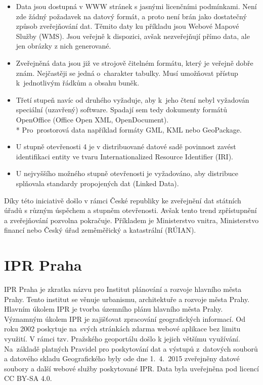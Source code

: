 \begin{itemize}

    \item   Data jsou dostupná v WWW stránek s jasnými licenčními
            podmínkami. Není zde žádný požadavek na datový formát,
            a proto není brán jako dostatečný způsob zveřejňování dat.
            Těmito daty ku příkladu jsou Webové Mapové Služby (WMS).
            Jsou veřejně k dispozici, avšak nezveřejňují přímo data,
            ale jen obrázky z nich generované.

    \item   Zveřejněná data jsou již ve strojově čitelném formátu,
            který je veřejně dobře znám. Nejčastěji se jedná
            o~charakter tabulky. Musí umožňovat přístup k~jednotlivým
            řádkům a obsahu buněk.

    \item   Třetí stupeň navíc od druhého vyžaduje, aby k~jeho čtení
            nebyl vyžadován speciální (uzavřený) software. Spadají sem tedy dokumenty formátů
            OpenOffice (Office Open XML, OpenDocument).
        \\* Pro~prostorová data například formáty GML, KML nebo
            GeoPackage.

    \item   U stupně otevřenosti 4 je v distribuované datové sadě
            povinnost zavést identifikaci entity ve tvaru
            Internationalized Resource Identifier (IRI).

    \item   U nejvyššího možného stupně otevřenosti je vyžadováno, aby
            distribuce splňovala standardy propojených dat (Linked
            Data).

\end{itemize}

Díky této iniciativě došlo v rámci České republiky ke zveřejnění
dat státních úřadů s různým úspěchem a stupněm otevřenosti.
Avšak tento trend zpřístupnění a zveřejňování pozvolna pokračuje.
Příkladem je Ministerstvo vnitra, Ministerstvo financí nebo Český úřad zeměměřický a katastrální (RÚIAN).


\section{IPR Praha}
\label{IPR Praha}
IPR Praha je zkratka názvu pro Institut plánování a rozvoje
hlavního města Prahy. Tento institut se věnuje urbanismu, architektuře
a rozvoje města Prahy. Hlavním úkolem IPR je tvorba územního plánu
hlavního města Prahy. Významným úkolem IPR je zajišťovat zpracování geografických
informací. Od roku 2002 poskytuje
na~svých stránkách zdarma webové aplikace bez limitu využití.
V rámci tzv. Pražského geoportálu došlo k jejich většímu využívání.
Na~základě platných Pravidel pro poskytování dat a výstupů z~datových
souborů a datového skladu Geografického byly ode dne 1.~4.~2015
zveřejněny datové soubory a další webové služby poskytované IPR. Data byla
uveřejněna pod licencí CC BY-SA 4.0. \cite{IPR}

